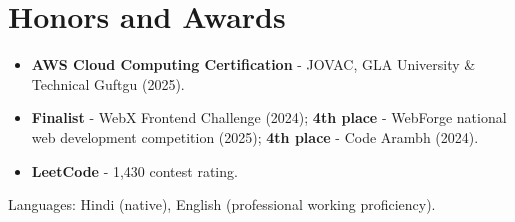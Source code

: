 \documentclass[11pt,a4paper,sans]{moderncv}
\begin{document}
\section{Honors and Awards}
\vspace{1pt}
\begin{itemize}
    \item {\textbf{AWS Cloud Computing Certification} - JOVAC, GLA University \& Technical Guftgu (2025).}
    \item {\textbf{Finalist} - WebX Frontend Challenge (2024); \textbf{4th place} - WebForge national web development competition (2025); \textbf{4th place} - Code Arambh (2024).}
    \item {\textbf{LeetCode} - 1,430 contest rating.}
\end{itemize}


\vspace{2pt}
\small{Languages: Hindi (native), English (professional working proficiency).}
\end{document}
